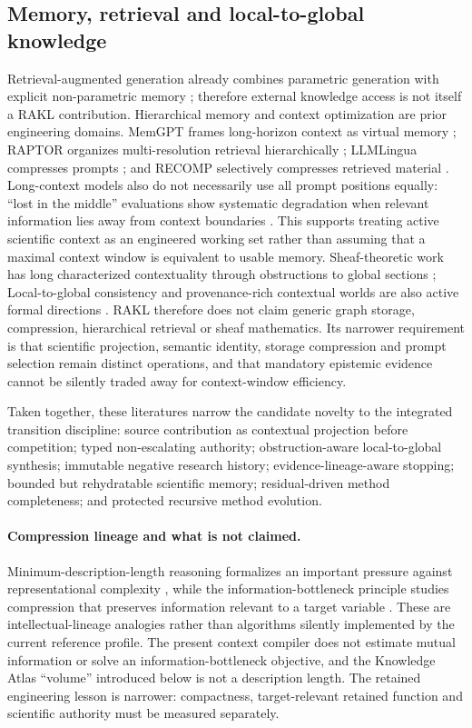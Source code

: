 \subsection{Memory, retrieval and local-to-global knowledge}
Retrieval-augmented generation already combines parametric generation with explicit non-parametric memory \cite{lewis2020}; therefore external knowledge access is not itself a RAKL contribution. Hierarchical memory and context optimization are prior engineering domains. MemGPT frames long-horizon context as virtual memory \cite{packer2023}; RAPTOR organizes multi-resolution retrieval hierarchically \cite{sarthi2024}; LLMLingua compresses prompts \cite{jiang2023}; and RECOMP selectively compresses retrieved material \cite{xu2023}. Long-context models also do not necessarily use all prompt positions equally: ``lost in the middle'' evaluations show systematic degradation when relevant information lies away from context boundaries \cite{liu2024}. This supports treating active scientific context as an engineered working set rather than assuming that a maximal context window is equivalent to usable memory. Sheaf-theoretic work has long characterized contextuality through obstructions to global sections \cite{abramsky2011}; Local-to-global consistency and provenance-rich contextual worlds are also active formal directions \cite{gibson2026,vitali2026}. RAKL therefore does not claim generic graph storage, compression, hierarchical retrieval or sheaf mathematics. Its narrower requirement is that scientific projection, semantic identity, storage compression and prompt selection remain distinct operations, and that mandatory epistemic evidence cannot be silently traded away for context-window efficiency.

Taken together, these literatures narrow the candidate novelty to the integrated transition discipline: source contribution as contextual projection before competition; typed non-escalating authority; obstruction-aware local-to-global synthesis; immutable negative research history; evidence-lineage-aware stopping; bounded but rehydratable scientific memory; residual-driven method completeness; and protected recursive method evolution.

\paragraph{Compression lineage and what is not claimed.}
Minimum-description-length reasoning formalizes an important pressure against representational complexity \cite{rissanen1978}, while the information-bottleneck principle studies compression that preserves information relevant to a target variable \cite{tishby2000}. These are intellectual-lineage analogies rather than algorithms silently implemented by the current reference profile. The present context compiler does not estimate mutual information or solve an information-bottleneck objective, and the Knowledge Atlas ``volume'' introduced below is not a description length. The retained engineering lesson is narrower: compactness, target-relevant retained function and scientific authority must be measured separately.
